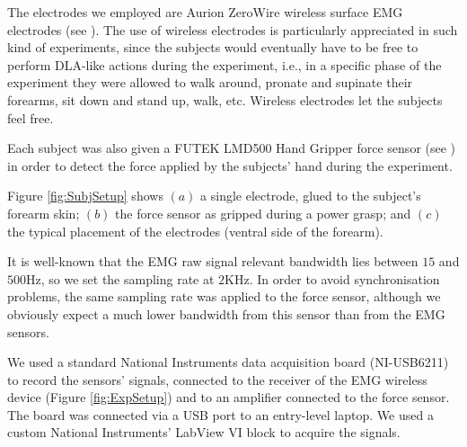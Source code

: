 The electrodes we employed are Aurion ZeroWire wireless surface EMG
electrodes (see \cite{zerowire}). The use of wireless electrodes is
particularly appreciated in such kind of experiments, since the
subjects would eventually have to be free to perform DLA-like actions
during the experiment, i.e., in a specific phase of the experiment
they were allowed to walk around, pronate and supinate their forearms,
sit down and stand up, walk, etc. Wireless electrodes let the subjects
feel free.

Each subject was also given a FUTEK LMD500 Hand Gripper force sensor
(see \cite{LMD500}) in order to detect the force applied by the subjects'
hand during the experiment.

Figure \ref{fig:SubjSetup} shows $(a)$ a single electrode, glued to
the subject's forearm skin; $(b)$ the force sensor as gripped during a
power grasp; and $(c)$ the typical placement of the electrodes
(ventral side of the forearm).

It is well-known that the EMG raw signal relevant bandwidth lies
between $15$ and $500$Hz, so we set the sampling rate at $2$KHz. In
order to avoid synchronisation problems, the same sampling rate was
applied to the force sensor, although we obviously expect a much lower
bandwidth from this sensor than from the EMG sensors.

We used a standard National Instruments data acquisition board
(NI-USB6211) to record the sensors' signals, connected to the receiver
of the EMG wireless device (Figure \ref{fig:ExpSetup}) and to an
amplifier connected to the force sensor. The board was connected via a
USB port to an entry-level laptop. We used a custom National
Instruments' LabView VI block to acquire the signals.

